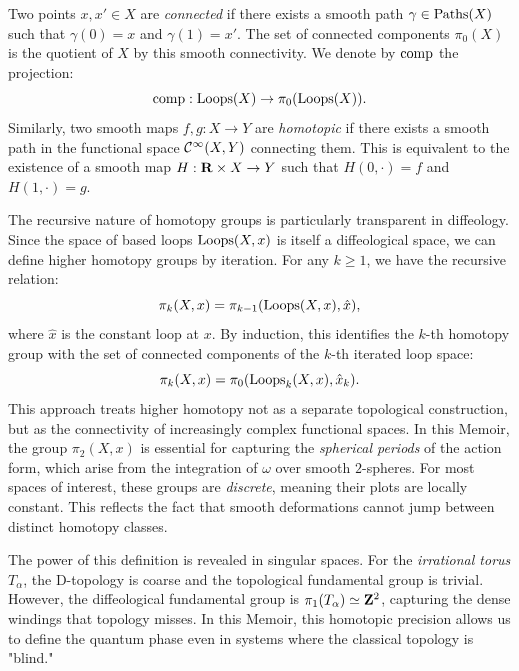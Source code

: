\documentclass[10pt,reqno,letterpaper,twoside]{amsbook}
\begin{document}
  \begin{article}
    Two points $x, x' \in X$ are \emph{connected} if there exists a smooth path $\gamma \in \operatorname{Paths}(X)$ such that $\gamma(0) = x$ and $\gamma(1) = x'$.
    The set of connected components $\pi_0(X)$ is the quotient of $X$ by this smooth connectivity.
    We denote by $\operatorname{comp}$ the projection:
    $$
      \operatorname{comp}: \operatorname{Loops}(X) \to \pi_0(\operatorname{Loops}(X)).
      $$%
    Similarly,
    two smooth maps $f, g: X \to Y$ are \emph{homotopic} if there exists a smooth path in the functional space ${\mathcal{C}}^\infty(X, Y)$ connecting them.
    This is equivalent to the existence of a smooth map $H: {\mathbf{R}} \times X \to Y$ such that $H(0, \cdot) = f$ and $H(1, \cdot) = g$.
  \end{article}
  
  \begin{article}
    The recursive nature of homotopy groups is particularly transparent in diffeology.
    Since the space of based loops $\operatorname{Loops}(X, x)$ is itself a diffeological space,
    we can define higher homotopy groups by iteration.
    For any $k \geq 1$,
    we have the recursive relation:
    $$
      \pi_k(X, x) = \pi_{k-1}(\operatorname{Loops}(X, x), \hat{x}),
      $$%
    where $\hat{x}$ is the constant loop at $x$.
    By induction,
    this identifies the $k$-th homotopy group with the set of connected components of the $k$-th iterated loop space:
    $$
      \pi_k(X, x) = \pi_0(\operatorname{Loops}_k(X,x), \hat{x}_k).
      $$%
    This approach treats higher homotopy not as a separate topological construction,
    but as the connectivity of increasingly complex functional spaces.
    In this Memoir,
    the group $\pi_2(X, x)$ is essential for capturing the \emph{spherical periods} of the action form,
    which arise from the integration of $\omega$ over smooth $2$-spheres.
    For most spaces of interest,
    these groups are \emph{discrete},
    meaning their plots are locally constant.
    This reflects the fact that smooth deformations cannot jump between distinct homotopy classes.
    
    The power of this definition is revealed in singular spaces.
    For the \emph{irrational torus} $T_\alpha$,
    the D-topology is coarse and the topological fundamental group is trivial.
    However,
    the diffeological fundamental group is $\pi_1(T_\alpha) \simeq {\mathbf{Z}}^2$,
    capturing the dense windings that topology misses.
    In this Memoir,
    this homotopic precision allows us to define the quantum phase even in systems where the classical topology is "blind."
  \end{article}
  
\end{document}
